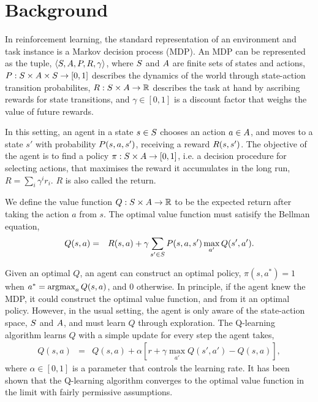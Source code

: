 \section{Background}
\label{sec:background}

In reinforcement learning, the standard representation of an environment
and task instance is a Markov decision process (MDP). An MDP can be
represented as the tuple, $\langle  S, A, P,
R, \gamma  \rangle$, where $S$ and $A$ are finite sets of
states and actions, $P: S \times A \times
S \to [0,1]$ describes the dynamics of the world through
state-action transition probabilites, $R: S \times A
\to \mathbb{R}$ describes the task at hand by ascribing rewards for state
transitions, and $\gamma \in [0,1]$ is a discount factor that weighs the
value of future rewards.

In this setting, an agent in a state $s \in S$ chooses an action
$a \in A$, and moves to a state $s'$ with probability
$P(s,a,s')$, receiving a reward $R(s,s')$. The
objective of the agent is to find a policy $\pi: S \times A
\to [0,1]$, i.e. a decision procedure for selecting actions, that
maximises the reward it accumulates in the long run, $R = \sum_{i}
\gamma^i r_i$. $R$ is also called the return.

We define the value function $Q: S \times A \to \mathbb{R}$ to be
the expected return after taking the action $a$ from $s$. The optimal
value function must satisify the Bellman equation, 
\begin{eqnarray*}
  Q(s,a) &=& R(s,a) + \gamma \sum_{s' \in S} P(s,a,s') \max_{a'} Q(s',a').
\end{eqnarray*}

Given an optimal $Q$, an agent can construct an optimal policy,
$\pi(s,a^*) = 1$ when $a^* = \operatorname{argmax}_{a} Q(s,a)$, and $0$ otherwise. In
principle, if the agent knew the MDP, it could construct the optimal
value function, and from it an optimal policy.  However, in the usual
setting, the agent is only aware of the state-action space, $S$
and $A$, and must learn $Q$ through exploration. The Q-learning
algorithm learns $Q$ with a simple update for every step the agent
takes, 
\begin{eqnarray*}
    Q(s,a) &=& Q(s,a) + \alpha [ r + \gamma \max_{a'} Q(s',a') - Q(s,a) ],
\end{eqnarray*}
\noindent
where $\alpha \in [0,1]$ is a parameter that controls the learning rate.
It has been shown that the Q-learning algorithm converges to the optimal
value function in the limit with fairly permissive assumptions.

